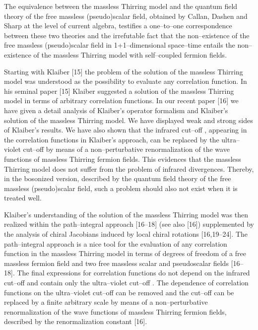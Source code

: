 \documentclass[a4paper,12pt] {article}
\begin{document}
The equivalence between the massless Thirring model and the quantum
field theory of the free massless (pseudo)scalar field, obtained by
Callan, Dashen and Sharp at the level of current algebra, testifies a
one--to--one correspondence between these two theories and the
irrefutable fact that the non--existence of the free massless
(pseudo)scalar field in 1+1--dimensional space--time entails the
non--existence of the massless Thirring model with self--coupled
fermion fields. 

Starting with Klaiber [15] the problem of the solution of the massless
Thirring model was understood as the possibility to evaluate any
correlation function. In his seminal paper [15] Klaiber suggested a
solution of the massless Thirring model in terms of arbitrary
correlation functions. In our recent paper [16] we have given a detail
analysis of Klaiber's operator formalism and Klaiber's solution of the
massless Thirring model. We have displayed weak and strong sides of
Klaiber's results. We have also shown that the infrared cut--off
\myHighlight{$\mu$}\coordHE{}, appearing in the correlation functions in Klaiber's approach,
can be replaced by the ultra--violet cut--off \myHighlight{$\Lambda$}\coordHE{} by means of a
non--perturbative renormalization of the wave functions of massless
Thirring fermion fields. This evidences that the massless Thirring
model does not suffer from the problem of infrared
divergences. Thereby, in the bosonized version, described by the
quantum field theory of the free massless (pseudo)scalar field, such a
problem should also not exist when it is treated well.

Klaiber's understanding of the solution of the massless Thirring model
was then realized within the path--integral approach [16--18] (see
also [16]) supplemented by the analysis of chiral Jacobians induced by
local chiral rotations [16,19--24]. The path--integral approach is a
nice tool for the evaluation of any correlation function in the
massless Thirring model in terms of degrees of freedom of a free
massless fermion field and two free massless scalar and pseudoscalar
fields [16--18]. The final expressions for correlation functions do
not depend on the infrared cut--off and contain only the ultra--violet
cut--off \myHighlight{$\Lambda$}\coordHE{}. The dependence of correlation functions on the
ultra--violet cut--off \myHighlight{$\Lambda$}\coordHE{} can be removed and the cut--off
\myHighlight{$\Lambda $}\coordHE{} can be replaced by a finite arbitrary scale \coordHE{} by means of
a non--perturbative renormalization of the wave functions of massless
Thirring fermion fields, described by the renormalization constant
\coordHE{} [16].
\end{document}
